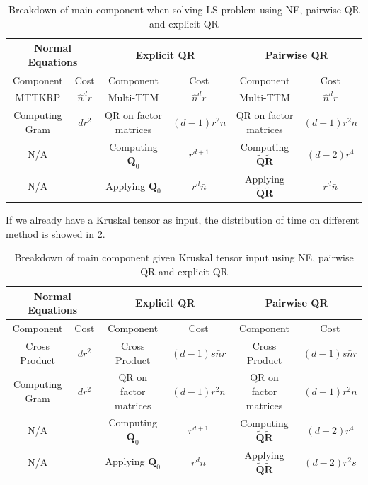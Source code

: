 \documentclass{article}
\newcommand{\mat}[1]{\mathbf{#1}}
\begin{document}
\begin{table}[!ht] 
  \centering
  \begin{tabular}{|c|c|c|c|c|c|}
    \hline
    \multicolumn{2}{|c|}{\textbf{Normal Equations}} & \multicolumn{2}{|c|}{\textbf{Explicit QR}} & \multicolumn{2}{|c|}{\textbf{Pairwise QR}} \\
    \hline
    Component & Cost & Component & Cost & Component & Cost \\
    \hline
    MTTKRP &$\hat n^d r$ &Multi-TTM &$\hat n^d r$  & Multi-TTM &$\hat n^d r$  \\
    Computing Gram & $dr^2$&QR on factor matrices & $(d-1)r^2\bar n$ & QR on factor matrices & $(d-1)r^2\bar n$\\
    N/A& &Computing $\mat{Q}_0$ & $r^{d+1}$& Computing $\tilde{\mat{Q}}\tilde{\mat{R}}$& $(d-2)r^4$\\
    N/A & &Applying $\mat{Q}_0$& $r^d\bar n$& Applying $\tilde{\mat{Q}}\tilde{\mat{R}}$& $r^d \bar n$\\
    \hline
  \end{tabular}
  \caption{Breakdown of main component when solving LS problem using NE, pairwise QR and explicit QR}
  \label{tab:dense_its_part}
\end{table}
If we already have a Kruskal tensor as input, the distribution of time on different method is showed in \cref{tab:kruskal_its_part}.
\begin{table}[!ht] 
  \centering
  \begin{tabular}{|c|c|c|c|c|c|}
    \hline
    \multicolumn{2}{|c|}{\textbf{Normal Equations}} & \multicolumn{2}{|c|}{\textbf{Explicit QR}} & \multicolumn{2}{|c|}{\textbf{Pairwise QR}} \\
    \hline
    Component & Cost & Component & Cost & Component & Cost \\
    \hline
    Cross Product &$dr^2$ &Cross Product&$(d-1)s\bar n r$  & Cross Product &$(d-1)s\bar n r$  \\
    Computing Gram & $dr^2$&QR on factor matrices & $(d-1)r^2\bar n$ & QR on factor matrices & $(d-1)r^2\bar n$\\
    N/A& &Computing $\mat{Q}_0$ & $r^{d+1}$& Computing $\tilde{\mat{Q}}\tilde{\mat{R}}$& $(d-2)r^4$\\
    N/A & &Applying $\mat{Q}_0$& $r^d\bar n$& Applying $\tilde{\mat{Q}}\tilde{\mat{R}}$& $(d-2)r^2s$\\
    \hline
  \end{tabular}
  \caption{Breakdown of main component given Kruskal tensor input using NE, pairwise QR and explicit QR}
  \label{tab:kruskal_its_part}
\end{table}
\end{document}
